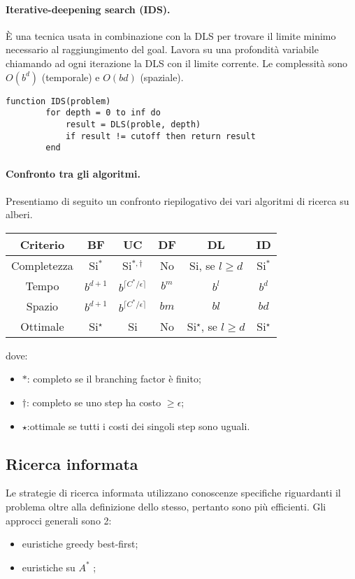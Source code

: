 \documentclass[a4paper, 11pt]{article}
\newcommand{\astar}{$A^\ast$ }
\begin{document}
\paragraph{Iterative-deepening search (IDS).} È una tecnica usata in combinazione con la DLS per trovare il limite minimo necessario al raggiungimento del goal. Lavora su una profondità variabile chiamando ad ogni iterazione la DLS con il limite corrente. Le complessità sono $O(b^d)$ (temporale) e $O(bd)$ (spaziale).

\begin{lstlisting}[frame=tb, caption={IDS}]
	function IDS(problem)
		for depth = 0 to inf do
			result = DLS(proble, depth)
			if result != cutoff then return result
		end
\end{lstlisting}

\paragraph{Confronto tra gli algoritmi.} Presentiamo di seguito un confronto riepilogativo dei vari algoritmi di ricerca su alberi. \\
\begin{center}
	\begin{tabular}{c ccccc}
		\toprule
		\textbf{Criterio} & \textbf{BF} & \textbf{UC} & \textbf{DF} & \textbf{DL} & \textbf{ID} \\
		\midrule
		Completezza & Si$^\ast$ & Si$^{\ast, \dagger}$ & No & Si, se $l \geq d$ & Si$^\ast$ \\
		Tempo & $b^{d+1}$ & $b^{\lceil C^\ast / \epsilon \rceil}$ & $b^m$ & $b^l$ & $b^d$ \\
		Spazio & $b^{d+1}$ & $b^{\lceil C^\ast / \epsilon \rceil}$ & $bm$ & $bl$ & $bd$ \\
		Ottimale & Si$^\star$ & Si & No & Si$^\star$, se $l \geq d$ & Si$^\star$ \\
		\bottomrule
	\end{tabular}
\end{center}
dove: \begin{itemize}
	\item $\ast$: completo se il branching factor è finito;
	\item $\dagger$: completo se uno step ha costo $\geq \epsilon$;
	\item $\star$:ottimale se tutti i costi dei singoli step sono uguali.
\end{itemize}

\subsection{Ricerca informata}
Le strategie di ricerca informata utilizzano conoscenze specifiche riguardanti il problema oltre alla definizione dello stesso, pertanto sono più efficienti.
Gli approcci generali sono 2: \begin{itemize}
	\item euristiche greedy best-first;
	\item euristiche su \astar;
\end{itemize}
\end{document}
